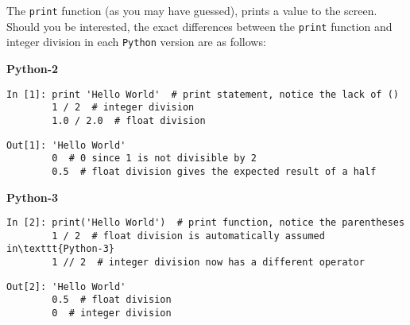 \begin{tcolorbox}[colback=red!5!white,colframe=red!75!black]
The \texttt{print} function (as you may have guessed), prints a value to the screen.
Should you be interested, the exact differences between the \texttt{print} function and integer division in each  \texttt{Python} version are as follows:

\noindent\textbf{Python-2}
\begin{lstlisting}[style=PY]
In [1]: print 'Hello World'  # print statement, notice the lack of ()
        1 / 2  # integer division
        1.0 / 2.0  # float division
\end{lstlisting}
\begin{lstlisting}[style=PY, backgroundcolor=\color{white}]
Out[1]: 'Hello World'
        0  # 0 since 1 is not divisible by 2
        0.5  # float division gives the expected result of a half
\end{lstlisting}

\noindent\textbf{Python-3}
\begin{lstlisting}[style=PY]
In [2]: print('Hello World')  # print function, notice the parentheses
        1 / 2  # float division is automatically assumed in\texttt{Python-3}
        1 // 2  # integer division now has a different operator
\end{lstlisting}
\begin{lstlisting}[style=PY, backgroundcolor=\color{white}]
Out[2]: 'Hello World'
        0.5  # float division
        0  # integer division
\end{lstlisting}
\end{tcolorbox}



